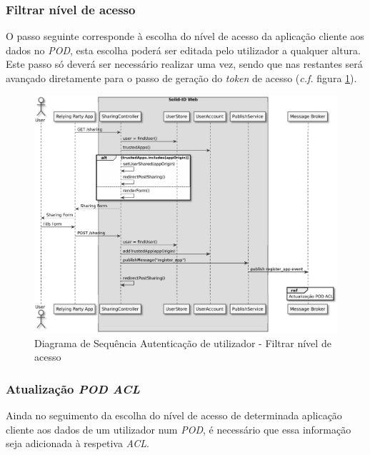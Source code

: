 \subsubsection{Filtrar nível de acesso}
O passo seguinte corresponde à escolha do nível de acesso da aplicação cliente aos dados no \emph{\acrshort{POD}}, esta escolha poderá ser editada pelo utilizador a qualquer altura.
Este passo só deverá ser necessário realizar uma vez, sendo que nas restantes será avançado diretamente para o passo de geração do \emph{token} de acesso (\emph{c.f.} figura \ref{autenticacao_sd2}).

\begin{figure}[H]
    \begin{center}
    \includegraphics[width=1 \textwidth]{figures/authentication_sd_2.eps}
    \caption{Diagrama de Sequência Autenticação de utilizador - Filtrar nível de acesso}
            \label{autenticacao_sd2}
    \end{center}
\end{figure}

\subsubsection{Atualização \emph{\acrshort{POD} \acrshort{ACL}}}
Ainda no seguimento da escolha do nível de acesso de determinada aplicação cliente aos dados de um utilizador num \emph{\acrshort{POD}}, é necessário que essa informação seja adicionada à respetiva \emph{\acrshort{ACL}}.

